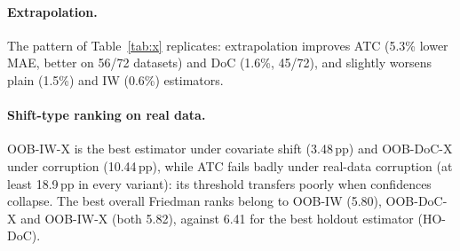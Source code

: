 \paragraph{Extrapolation.}
The pattern of Table~\ref{tab:x} replicates: extrapolation improves ATC (5.3\% lower MAE, better on 56/72 datasets) and DoC (1.6\%, 45/72), and slightly worsens plain (1.5\%) and IW (0.6\%) estimators.

\paragraph{Shift-type ranking on real data.}
OOB-IW-X is the best estimator under covariate shift (3.48\,pp) and OOB-DoC-X under corruption (10.44\,pp), while ATC fails badly under real-data corruption (at least 18.9\,pp in every variant): its threshold transfers poorly when confidences collapse. The best overall Friedman ranks belong to OOB-IW (5.80), OOB-DoC-X and OOB-IW-X (both 5.82), against 6.41 for the best holdout estimator (HO-DoC).


